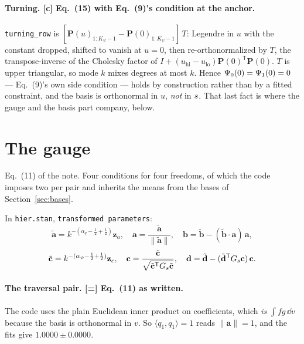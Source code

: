\documentclass[11pt]{article}
\newcommand{\file}[1]{\texttt{#1}}
\newcommand{\code}[1]{\texttt{#1}}
\begin{document}
\paragraph{Turning. [c] Eq.~(15) with Eq.~(9)'s condition at the anchor.}
\code{turning\_row} is
$[\mathbf{P}(u)_{1:K_{\psi}-1} - \mathbf{P}(0)_{1:K_{\psi}-1}]\,T$: Legendre in $u$ with the
constant dropped, shifted to vanish at $u = 0$, then re-orthonormalized by $T$, the
transpose-inverse of the Cholesky factor of $I + (u_{\mathrm{hi}} - u_{\mathrm{lo}})
\mathbf{P}(0)^{\mathsf T}\mathbf{P}(0)$. $T$ is upper triangular, so mode $k$ mixes degrees
at most $k$. Hence $\Psi_{0}(0) = \Psi_{1}(0) = 0$ --- Eq.~(9)'s own side condition --- holds by
construction rather than by a fitted constraint, and the basis is orthonormal in $u$,
\emph{not} in $s$. That last fact is where the gauge and the basis part company, below.

\section{The gauge}
\label{sec:gauge}

Eq.~(11) of the note. Four conditions for four freedoms, of which the code imposes two per
pair and inherits the means from the bases of Section~\ref{sec:bases}.

In \file{hier.stan}, \code{transformed parameters}:
\begin{equation}
  \tilde{\mathbf{a}} = k^{-(\alpha_{q}-\frac12+\frac12)}\mathbf{z}_{a} , \quad
  \mathbf{a} = \frac{\tilde{\mathbf{a}}}{\lVert\tilde{\mathbf{a}}\rVert} , \quad
  \mathbf{b} = \tilde{\mathbf{b}} - (\tilde{\mathbf{b}}\!\cdot\!\mathbf{a})\,\mathbf{a} ,
\end{equation}
\begin{equation}
  \tilde{\mathbf{c}} = k^{-(\alpha_{\psi}-\frac12+\frac12)}\mathbf{z}_{c} , \quad
  \mathbf{c} = \frac{\tilde{\mathbf{c}}}{\sqrt{\tilde{\mathbf{c}}^{\mathsf T}
    G_{s}\tilde{\mathbf{c}}}} , \quad
  \mathbf{d} = \tilde{\mathbf{d}} - (\tilde{\mathbf{d}}^{\mathsf T}G_{s}\mathbf{c})\,
    \mathbf{c} .
\end{equation}
\paragraph{The traversal pair. [=] Eq.~(11) as written.} The code uses the plain Euclidean
inner product on coefficients, which \emph{is} $\int fg\,\dd v$ because the basis is
orthonormal in $v$. So $\langle q_{1},q_{1}\rangle = 1$ reads
$\lVert\mathbf{a}\rVert = 1$, and the fits give $1.0000 \pm 0.0000$.
\end{document}
